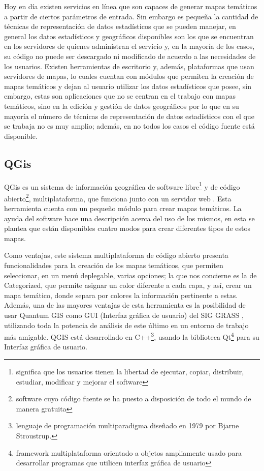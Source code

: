 Hoy en d\'ia existen servicios en l\'inea que son capaces de generar mapas tem\'aticos a partir de ciertos par\'ametros de entrada. Sin embargo es peque\~na la cantidad de t\'ecnicas de representaci\'on de datos estad\'isticos que se pueden manejar, en general los datos estad\'isticos y geogr\'aficos disponibles son los que se encuentran en los servidores de quienes administran el servicio y, en la mayor\'ia de los casos, su c\'odigo no puede ser descargado ni modificado de acuerdo a las necesidades de los usuarios. Existen herramientas de escritorio y, adem\'as, plataformas que usan servidores de mapas, lo cuales cuentan con m\'odulos que permiten la creaci\'on de mapas tem\'aticos y dejan al usuario utilizar los datos estad\'isticos que posee, sin embargo, estas son aplicaciones que no se centran en el trabajo con mapas tem\'aticos, sino en la edici\'on y gesti\'on de datos geogr\'aficos por lo que en su mayor\'ia el n\'umero de t\'ecnicas de representaci\'on de datos estad\'isticos con el que se trabaja no es muy amplio; adem\'as, en no todos los casos el c\'odigo fuente est\'a disponible.


\subsection{QGis}
QGis es un sistema de informaci\'on geogr\'afica de software libre\footnote{significa que los usuarios tienen la libertad de ejecutar, copiar, distribuir, estudiar, modificar y mejorar el software} y de c\'odigo abierto\footnote{software cuyo c\'odigo fuente se ha puesto a disposici\'on de todo el mundo de manera gratuita}, multiplataforma, que funciona junto con un servidor web \cite{ART}. Esta herramienta cuenta con un peque\~no m\'odulo para crear mapas tem\'aticos. La ayuda del software hace una descripci\'on acerca del uso de los mismos, en esta se plantea que est\'an disponibles cuatro modos para crear diferentes tipos de estos mapas.  

Como ventajas, este sistema multiplataforma de c\'odigo abierto presenta funcionalidades para la creaci\'on de los mapas tem\'aticos, que permiten seleccionar, en un men\'u deplegable, varias opciones; la que nos concierne es la de Categorized, que permite asignar un color diferente a cada capa, y as\'i, crear un mapa tem\'atico, donde separa por colores la informaci\'on pertinente a estas. Adem\'as, una de las mayores ventajas de esta herramienta es la posibilidad de usar Quantum GIS como GUI (Interfaz gr\'afica de usuario) del SIG GRASS \cite{qgis}, utilizando toda la potencia de an\'alisis de este \'ultimo en un entorno de trabajo m\'as amigable. QGIS est\'a desarrollado en C++\footnote{lenguaje de programaci\'on multiparadigma dise\~nado en 1979 por Bjarne Stroustrup.}, usando la biblioteca Qt\footnote{framework multiplataforma orientado a objetos ampliamente usado para desarrollar programas que utilicen interfaz gr\'afica de usuario} para su Interfaz gr\'afica de usuario.

